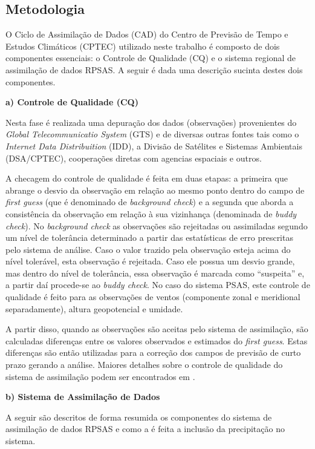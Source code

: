 \subsection{Metodologia}

O Ciclo de Assimilação de Dados (CAD) do Centro de Previsão de Tempo e Estudos Climáticos (CPTEC) utilizado neste trabalho é composto de dois  componentes essenciais: o Controle de Qualidade (CQ) e o sistema regional de assimilação de dados RPSAS. A seguir é dada uma descrição sucinta destes dois componentes.

\textbf{a) Controle de Qualidade (CQ)}

Nesta fase é realizada uma depuração dos dados (observações) provenientes do \textit{Global Telecommunicatio System} (GTS) e de diversas outras fontes tais como o \textit{Internet Data Distribuition} (IDD), a Divisão de Satélites e Sistemas Ambientais (DSA/CPTEC), cooperações diretas com agencias espaciais e outros.

A checagem do controle de qualidade é feita em duas etapas: a primeira que abrange o desvio da observação em relação ao mesmo ponto dentro do campo de \textit{first guess} (que é denominado de \textit{background check}) e a segunda que aborda a consistência da observação em relação à sua vizinhança (denominada de \textit{buddy check}). No \textit{background check} as observações são rejeitadas ou assimiladas segundo um nível de tolerância determinado a partir das estatísticas de erro prescritas pelo sistema de análise. Caso o valor trazido pela observação esteja acima do nível tolerável, esta observação é rejeitada. Caso ele possua um desvio grande, mas dentro do nível de tolerância, essa observação é marcada como ``suspeita'' e, a partir daí procede-se ao \textit{buddy check}. No caso do sistema PSAS, este controle de qualidade é feito para as observações de ventos (componente zonal e meridional separadamente), altura geopotencial e umidade.

A partir disso, quando as observações são aceitas pelo sistema de assimilação, são calculadas diferenças entre os valores observados e estimados do \textit{first guess}. Estas diferenças são então utilizadas para a correção dos campos de previsão de curto prazo gerando a análise.  Maiores detalhes sobre o controle de qualidade do sistema de assimilação podem ser encontrados em .

\textbf{b) Sistema de Assimilação de Dados}

A seguir são descritos de forma resumida os componentes do sistema de assimilação de dados RPSAS e como a é feita a inclusão da precipitação no sistema.

